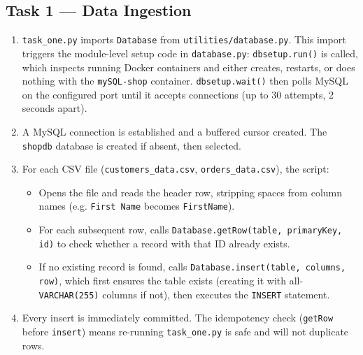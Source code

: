 \documentclass[12pt,a4paper]{article}
\begin{document}
\subsection{Task 1 --- Data Ingestion}

\begin{enumerate}[leftmargin=2em]
    \item \texttt{task\_one.py} imports \texttt{Database} from
          \texttt{utilities/database.py}. This import triggers the module-level
          setup code in \texttt{database.py}: \texttt{dbsetup.run()} is called,
          which inspects running Docker containers and either creates, restarts,
          or does nothing with the \texttt{mySQL-shop} container.
          \texttt{dbsetup.wait()} then polls MySQL on the configured port until
          it accepts connections (up to 30 attempts, 2 seconds apart).

    \item A MySQL connection is established and a buffered cursor created.
          The \texttt{shopdb} database is created if absent, then selected.

    \item For each CSV file (\texttt{customers\_data.csv},
          \texttt{orders\_data.csv}), the script:
          \begin{itemize}
              \item Opens the file and reads the header row, stripping spaces
                    from column names (e.g. \texttt{First Name} becomes
                    \texttt{FirstName}).
              \item For each subsequent row, calls
                    \texttt{Database.getRow(table, primaryKey, id)} to check
                    whether a record with that ID already exists.
              \item If no existing record is found, calls
                    \texttt{Database.insert(table, columns, row)}, which first
                    ensures the table exists (creating it with all-\texttt{VARCHAR(255)}
                    columns if not), then executes the \texttt{INSERT} statement.
          \end{itemize}

    \item Every insert is immediately committed. The idempotency check
          (\texttt{getRow} before \texttt{insert}) means re-running
          \texttt{task\_one.py} is safe and will not duplicate rows.
\end{enumerate}
\end{document}
